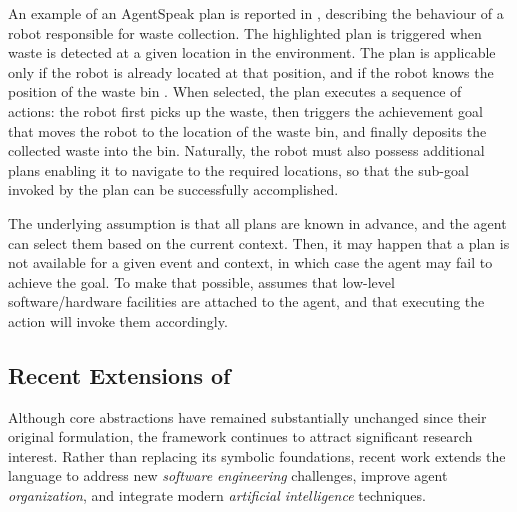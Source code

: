 An example of an AgentSpeak plan is reported in , 
describing the behaviour of a robot responsible for waste collection. 
%
The highlighted plan is triggered when waste is detected at a given location  in the environment. 
%
The plan is applicable only if the robot is already located at that position, 
and if the robot knows the position of the waste bin . 
%
When selected, 
the plan executes a sequence of actions: 
the robot first picks up the waste, 
then triggers the achievement goal that moves the robot to the location of the waste bin, 
and finally deposits the collected waste into the bin. 
%
Naturally, 
the robot must also possess additional plans enabling it to navigate to the required locations, 
so that the sub-goal invoked by the plan can be successfully accomplished.

%
The underlying \agentspeak{} assumption is that all plans are known in advance,
and the agent can select them based on the current context.
%
Then,
it may happen that a plan is not available for a given event and context,
in which case the agent may fail to achieve the goal.
%
To make that possible,
\agentspeak{} assumes that low-level software/hardware facilities are attached to the agent,
and that executing the action will invoke them accordingly.
%

\subsection{Recent Extensions of \agentspeak{}}

Although \agentspeak{} core abstractions 
have remained substantially unchanged since their original formulation,
the framework continues to attract significant research interest. 
%
Rather than replacing its symbolic foundations, 
recent work extends the language to address new \emph{software engineering} challenges, improve agent \emph{organization}, and integrate modern \emph{artificial intelligence} techniques. 

